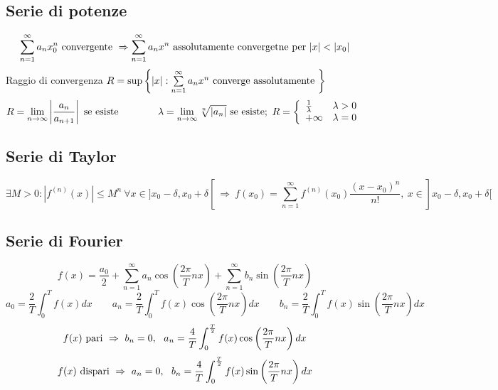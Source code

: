\documentclass[]{article}
\newcommand{\serie}{\sum\limits_{n=1}^{\infty}}
\newcommand{\linf}{\lim\limits_{n \to \infty}}
\newcommand{\conv}{\textnormal{ convergente }}
\begin{document}
\subsection{Serie di potenze}

\[\serie a_n x_0^n \conv \Rightarrow \serie a_n x^n \textnormal{ assolutamente convergetne per } |x|<|x_0| \]
Raggio di convergenza \(R=\sup\left\{|x| : \serie a_n x^n \textnormal{ converge assolutamente }\right\}\)\newline
\[R=\linf\left|\frac{a_n}{a_{n+1}}\right| \textnormal{ se esiste} \qquad\qquad
\lambda=\linf \sqrt[n]{|a_n|} \textnormal{ se esiste}; \ R=\left\{\begin{array}{l r}
\frac{1}{\lambda} & \lambda>0 \\
+\infty & \lambda=0
\end{array}\right.\]

\subsection{Serie di Taylor}
\[
\exists M>0 : |f^{(n)}(x)| \le M^n \ \forall x\in ]x_0-\delta,x_0+\delta[ \ \Rightarrow \ f(x_0)=\serie f^{(n)}(x_0)\frac{(x-x_0)^n}{n!}, \ x\in]x_0-\delta,x_0+\delta[
\]

\subsection{Serie di Fourier}
\[
f(x)=\frac{a_{0}}{2}+\serie{a_{n}\cos\left(\frac{2\pi}{T}nx\right)}+\serie{b_{n}\sin\left(\frac{2\pi}{T}nx\right)}
\]
\[
a_{0}=
\frac{2}{T}\int_0^T{f(x)dx} \qquad
a_{n}=
\frac{2}{T}\int_0^T{f(x)\cos\left(\frac{2\pi}{T}nx\right)dx} \qquad
b_{n}=
\frac{2}{T}\int_0^T{f(x)\sin\left(\frac{2\pi}{T}nx\right)dx}
\]
\[
f(x) \textnormal{ pari } \Rightarrow \ b_{n}=0, \ \ a_{n}=\frac{4}{T}\int_{0}^{\frac{T}{2}}{f(x)\cos\left(\frac{2\pi}{T}nx\right)dx}
\]
\[
f(x) \textnormal{ dispari } \Rightarrow \ a_{n}=0, \ \ b_{n}=\frac{4}{T}\int_{0}^{\frac{T}{2}}{f(x)\sin\left(\frac{2\pi}{T}nx\right)dx}
\]
\end{document}
